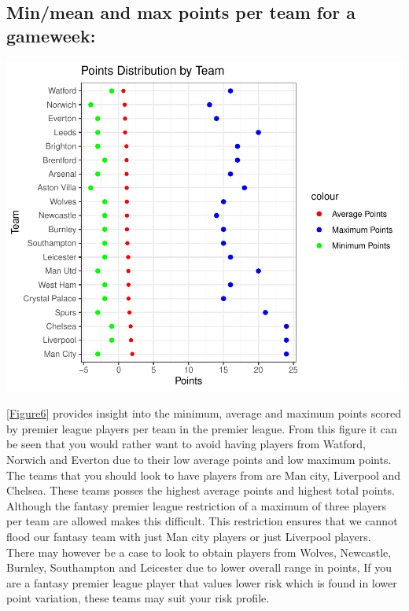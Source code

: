 \documentclass[11pt,preprint, authoryear]{elsarticle}
\let\origfigure\figure
\let\endorigfigure\endfigure
\renewenvironment{figure}[1][2] {
    \expandafter\origfigure\expandafter[H]
} {
    \endorigfigure
}
\numberwithin{equation}{section}
\numberwithin{figure}{section}
\numberwithin{table}{section}
\begin{document}
\hypertarget{minmean-and-max-points-per-team-for-a-gameweek}{%
\subsection{Min/mean and max points per team for a
gameweek:}\label{minmean-and-max-points-per-team-for-a-gameweek}}

\begin{figure}[H]

{\centering \includegraphics{Fantasy_premier_league_team_prediction_files/figure-latex/unnamed-chunk-7-1} 

}

\caption{Team points min average and max distribution plot\label{Figure6}}\label{fig:unnamed-chunk-7}
\end{figure}

\ref{Figure6} provides insight into the minimum, average and maximum
points scored by premier league players per team in the premier league.
From this figure it can be seen that you would rather want to avoid
having players from Watford, Norwich and Everton due to their low
average points and low maximum points. The teams that you should look to
have players from are Man city, Liverpool and Chelsea. These teams
posses the highest average points and highest total points. Although the
fantasy premier league restriction of a maximum of three players per
team are allowed makes this difficult. This restriction ensures that we
cannot flood our fantasy team with just Man city players or just
Liverpool players. There may however be a case to look to obtain players
from Wolves, Newcastle, Burnley, Southampton and Leicester due to lower
overall range in points, If you are a fantasy premier league player that
values lower risk which is found in lower point variation, these teams
may suit your risk profile.
\end{document}
